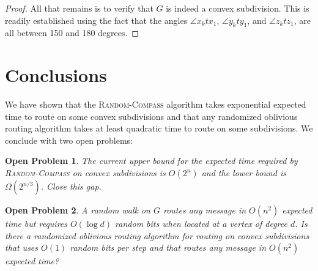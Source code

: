 \documentclass [letterpaper] {patmorin}
\newtheorem{op}{Open Problem}
\begin{document}
\begin{proof}
All that remains is to verify that $G$ is indeed a convex subdivision.  This is
readily established using the fact that the angles $\angle x_k t x_1$, $\angle y_k t y_1$, and $\angle z_k t z_1$, are all between 150 and 180 degrees.
%
%
%
%
%
%
\end{proof}

\section{Conclusions}

We have shown that the \textsc{Random-Compass} algorithm takes exponential
expected time to route on some convex subdivisions and that any randomized
oblivious routing algorithm takes at least quadratic time to route on some
subdivisions.  We conclude with two open problems:

\begin{op}
The current upper bound for the expected time required by \textsc{Random-Compass} on convex subdivisions is $O(2^n)$ and the lower bound is $\Omega(2^{n/3})$.  Close this gap.
\end{op}

\begin{op}
A random walk on $G$ routes any message in $O(n^2)$ expected time but requires $O(\log d)$ random bits when located at a vertex of degree $d$.  Is there a randomized oblivious routing algorithm for routing on convex subdivisions that uses $O(1)$ random bits per step and that routes any message in $O(n^2)$ expected time?
\end{op}








\end{document}

